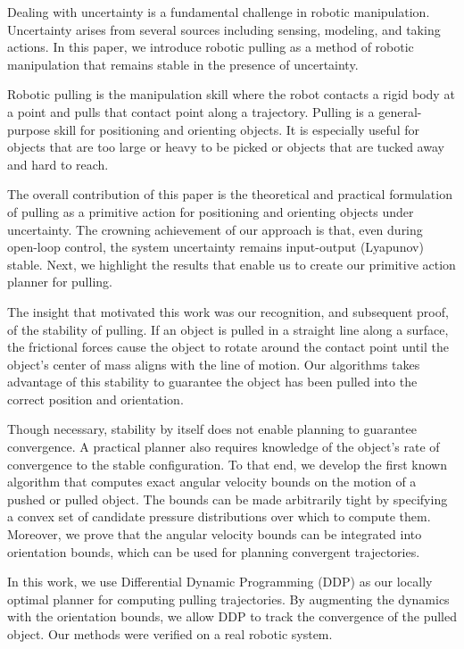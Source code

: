 \documentclass[conference]{IEEEtran}
\begin{document}

Dealing with uncertainty is a fundamental challenge in robotic
manipulation. Uncertainty arises from several sources including
sensing, modeling, and taking actions. In this paper, we introduce
robotic pulling as a method of robotic manipulation that remains
stable in the presence of uncertainty.

Robotic pulling is the manipulation skill where the robot contacts a
rigid body at a point and pulls that contact point along a
trajectory. Pulling is a general-purpose skill for positioning and
orienting objects. It is especially useful for objects that are too
large or heavy to be picked or objects that are tucked away and hard
to reach.

The overall contribution of this paper is the theoretical and
practical formulation of pulling as a primitive action for positioning
and orienting objects under uncertainty. The crowning achievement of
our approach is that, even during open-loop control, the system
uncertainty remains input-output (Lyapunov) stable. Next, we highlight
the results that enable us to create our primitive action planner for
pulling.

The insight that motivated this work was our recognition, and
subsequent proof, of the stability of pulling. If an object is pulled
in a straight line along a surface, the frictional forces cause the
object to rotate around the contact point until the object's center of
mass aligns with the line of motion. Our algorithms takes advantage of
this stability to guarantee the object has been pulled into the
correct position and orientation.

Though necessary, stability by itself does not enable planning to
guarantee convergence. A practical planner also requires knowledge of
the object's rate of convergence to the stable configuration. To that
end, we develop the first known algorithm that computes exact angular
velocity bounds on the motion of a pushed or pulled object. The bounds
can be made arbitrarily tight by specifying a convex set of candidate
pressure distributions over which to compute them. Moreover, we prove
that the angular velocity bounds can be integrated into orientation
bounds, which can be used for planning convergent trajectories.

In this work, we use Differential Dynamic Programming (DDP) as our
locally optimal planner for computing pulling trajectories. By
augmenting the dynamics with the orientation bounds, we allow DDP to
track the convergence of the pulled object. Our methods were verified
on a real robotic system.
\end{document}
